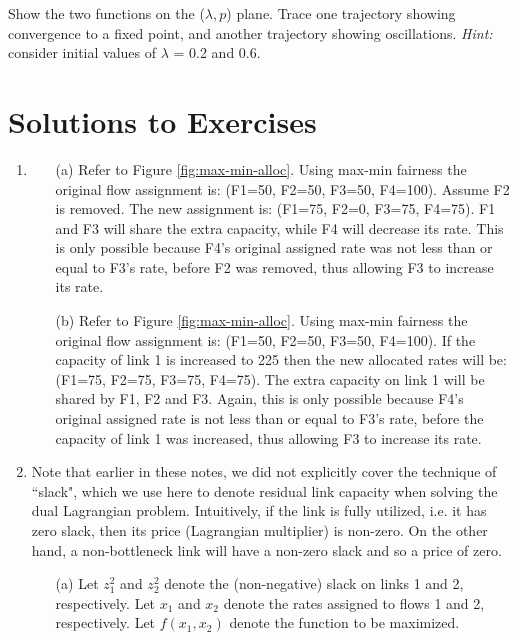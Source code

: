 \documentclass{article}
\begin{document}
\begin{enumerate}
Show the two functions on the ($\lambda, p$) plane. Trace one
trajectory showing convergence to a fixed point, and another
trajectory showing oscillations. {\em Hint:} consider initial
values of $\lambda$ = 0.2 and 0.6.



\end{enumerate}


\section{Solutions to Exercises}
\label{sec:solutions}

\begin{enumerate}

\item 


\begin{itemize}
\item[(a)] Refer to Figure \ref{fig:max-min-alloc}. Using max-min fairness the original
flow assignment is: (F1=50, F2=50, F3=50, F4=100). Assume F2 is
removed. The new assignment is: (F1=75, F2=0, F3=75, F4=75). F1
and F3 will share the extra capacity, while F4 will decrease its
rate. This is only possible because F4's original assigned rate
was not less than or equal to F3's rate, before F2 was removed,
thus allowing F3 to increase its rate. 

\item[(b)] Refer to Figure \ref{fig:max-min-alloc}. Using max-min fairness the original
flow assignment is: (F1=50, F2=50, F3=50, F4=100). If the capacity
of link 1 is increased to 225 then the new allocated rates will
be: (F1=75, F2=75, F3=75, F4=75). The extra capacity on link 1
will be shared by F1, F2 and F3. Again, this is only possible
because F4's original assigned rate is not less than or equal to
F3's rate, before the capacity of link 1 was increased, thus
allowing F3 to increase its rate. 
\end{itemize}

\item

Note that earlier in these notes, we did not explicitly cover the technique of ``slack",
which we use here to denote residual link capacity when solving the dual Lagrangian problem.
Intuitively, if the link is fully utilized, i.e. it has zero slack,
then its price (Lagrangian multiplier) is non-zero.
On the other hand, a non-bottleneck link will have a non-zero slack
and so a price of zero.

\begin{itemize}
\item[(a)] Let $z_1^2$ and $z_2^2$ denote the (non-negative) slack on links 1 and
2, respectively. Let $x_1$ and $x_2$ denote the rates assigned to
flows 1 and 2, respectively. Let $f(x_1, x_2)$ denote the function
to be maximized.


\end{itemize}
\end{enumerate}
\end{document}

